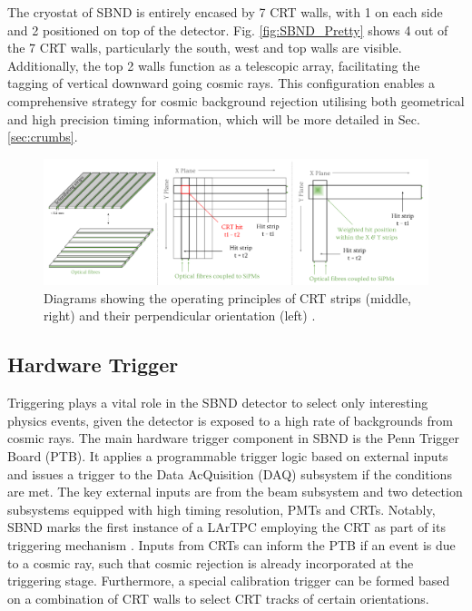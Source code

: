 The cryostat of SBND is entirely encased by 7 CRT walls, with 1 on each side and 2 positioned on top of the detector.                                                                       
Fig. \ref{fig:SBND_Pretty} shows 4 out of the 7 CRT walls, particularly the south, west and top walls are visible.                                                                          
Additionally, the top 2 walls function as a telescopic array, facilitating the tagging of vertical downward going cosmic rays.
This configuration enables a comprehensive strategy for cosmic background rejection utilising both geometrical and high precision timing information, which will be more detailed in Sec. \ref{sec:crumbs}.

\begin{figure}[hb!] 
\centering    
\includegraphics[width=1.0\textwidth]{SBND_CRT}
\caption[Cosmic Ray Tagger Diagrams]{
Diagrams showing the operating principles of CRT strips (middle, right) and their perpendicular orientation (left) \cite{RhiannonPhD}.
}
\label{fig:SBND_CRT}
\end{figure}

\subsection{Hardware Trigger}
\label{sec:sbnd_trigger}

Triggering plays a vital role in the SBND detector to select only interesting physics events, given the detector is exposed to a high rate of backgrounds from cosmic rays. 
The main hardware trigger component in SBND is the Penn Trigger Board (PTB).
It applies a programmable trigger logic based on external inputs and issues a trigger to the Data AcQuisition (DAQ) subsystem if the conditions are met.
The key external inputs are from the beam subsystem and two detection subsystems equipped with high timing resolution, PMTs and CRTs. 
Notably, SBND marks the first instance of a LArTPC employing the CRT as part of its triggering mechanism \cite{CPAD2022}.
Inputs from CRTs can inform the PTB if an event is due to a cosmic ray, such that cosmic rejection is already incorporated at the triggering stage. 
Furthermore, a special calibration trigger can be formed based on a combination of CRT walls to select CRT tracks of certain orientations. 

